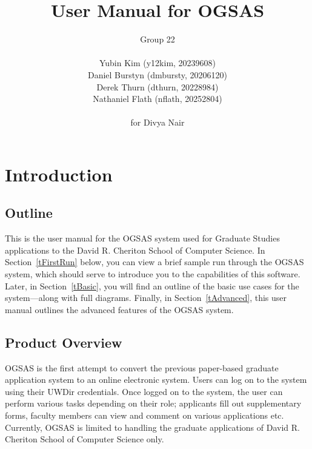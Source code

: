 \documentclass[titlepage]{article}
\title{User Manual for OGSAS}
\author{Group 22 \\
\\
Yubin Kim (y12kim, 20239608) \\
Daniel Burstyn (dmbursty, 20206120) \\
Derek Thurn (dthurn, 20228984) \\
Nathaniel Flath (nflath, 20252804)
\\
\\for Divya Nair}
\begin{document}
\maketitle
\newpage
\tableofcontents
\newpage
\listoffigures
\newpage

\section{Introduction}
\subsection{Outline}

This is the user manual for the OGSAS system used for Graduate Studies applications to the David R. Cheriton School of Computer Science. In Section~\ref{tFirstRun} below, you can view a brief sample run through the OGSAS system, which should serve to introduce you to the capabilities of this software. Later, in Section~\ref{tBasic}, you will find an outline of the basic use cases for the system---along with full diagrams. Finally, in Section~\ref{tAdvanced}, this user manual outlines the advanced features of the OGSAS system.

\subsection{Product Overview}
OGSAS is the first attempt to convert the previous paper-based graduate
application system to an online electronic system. Users can log on to the
system using their UWDir
credentials. Once logged on to the system, the user can perform various tasks
depending on their role; applicants fill out supplementary forms, faculty
members can view and comment on various applications etc.
Currently, OGSAS is limited to handling the graduate applications of David R.
Cheriton School of Computer Science only.
\end{document}
